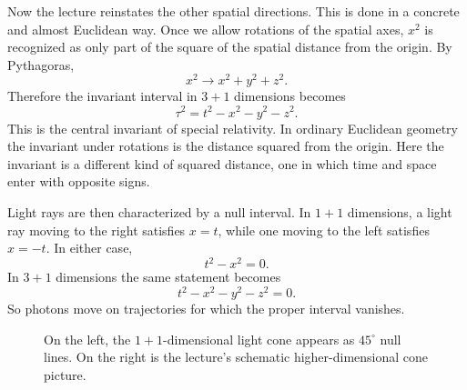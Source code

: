 Now the lecture reinstates the other spatial directions. This is done in a concrete and almost Euclidean way. Once we allow rotations of the spatial axes, \(x^2\) is recognized as only part of the square of the spatial distance from the origin. By Pythagoras,
\begin{equation}
x^2 \longrightarrow x^2+y^2+z^2.
\end{equation}
Therefore the invariant interval in \(3+1\) dimensions becomes
\begin{equation}
\tau^2=t^2-x^2-y^2-z^2.
\end{equation}
This is the central invariant of special relativity. In ordinary Euclidean geometry the invariant under rotations is the distance squared from the origin. Here the invariant is a different kind of squared distance, one in which time and space enter with opposite signs.

Light rays are then characterized by a null interval. In \(1+1\) dimensions, a light ray moving to the right satisfies \(x=t\), while one moving to the left satisfies \(x=-t\). In either case,
\begin{equation}
t^2-x^2=0.
\end{equation}
In \(3+1\) dimensions the same statement becomes
\begin{equation}
t^2-x^2-y^2-z^2=0.
\end{equation}
So photons move on trajectories for which the proper interval vanishes.

\begin{figure}[t]
\centering
{}
\hspace{1cm}
\caption{On the left, the \(1+1\)-dimensional light cone appears as \(45^\circ\) null lines. On the right is the lecture's schematic higher-dimensional cone picture.}
\end{figure}

